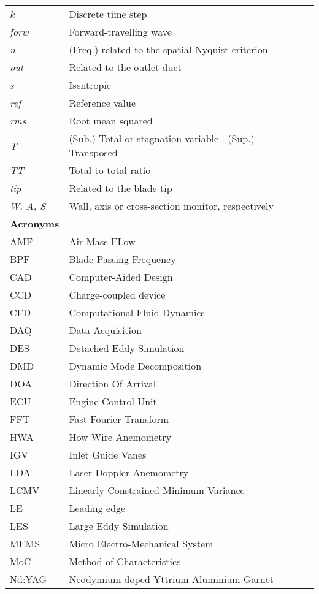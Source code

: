 \begin{longtable}{lll}
\emph{k} & Discrete time step \\
\emph{forw} & Forward-travelling wave\\
\emph{n} & (Freq.) related to the spatial Nyquist criterion\\
\emph{out} & Related to the outlet duct \\
\emph{s} & Isentropic\\
\emph{ref} & Reference value \\
\emph{rms} & Root mean squared \\
\emph{T} & (Sub.) Total or stagnation variable | (Sup.) Transposed\\
\emph{TT} & Total to total ratio \\
\emph{tip} & Related to the blade tip \\
\emph{W, A, S} & Wall, axis or cross-section monitor, respectively\\[5mm]
\newpage
\multicolumn{2}{l} {\sffamily\bfseries\Large {Acronyms}} \\[3mm]
AMF & Air Mass FLow \\
BPF & Blade Passing Frequency\\
CAD & Computer-Aided Design \\
CCD & Charge-coupled device \\
CFD & Computational Fluid Dynamics \\
DAQ & Data Acquisition \\
DES & Detached Eddy Simulation\\
DMD & Dynamic Mode Decomposition \\
DOA & Direction Of Arrival \\
ECU & Engine Control Unit\\
FFT & Fast Fourier Transform \\
HWA & How Wire Anemometry \\
IGV & Inlet Guide Vanes \\
LDA & Laser Doppler Anemometry \\
LCMV & Linearly-Constrained Minimum Variance \\
LE & Leading edge \\ 
LES & Large Eddy Simulation \\
MEMS & Micro Electro-Mechanical System \\
MoC & Method of Characteristics \\
Nd:YAG & Neodymium-doped Yttrium Aluminium Garnet\\

\end{longtable}
